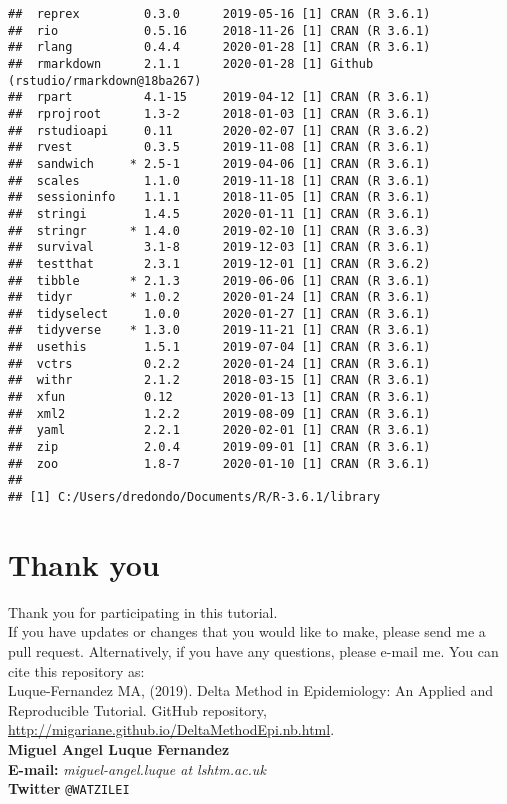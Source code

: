 \documentclass[
]{article}
\begin{document}
\begin{verbatim}
##  reprex         0.3.0      2019-05-16 [1] CRAN (R 3.6.1)                    
##  rio            0.5.16     2018-11-26 [1] CRAN (R 3.6.1)                    
##  rlang          0.4.4      2020-01-28 [1] CRAN (R 3.6.1)                    
##  rmarkdown      2.1.1      2020-01-28 [1] Github (rstudio/rmarkdown@18ba267)
##  rpart          4.1-15     2019-04-12 [1] CRAN (R 3.6.1)                    
##  rprojroot      1.3-2      2018-01-03 [1] CRAN (R 3.6.1)                    
##  rstudioapi     0.11       2020-02-07 [1] CRAN (R 3.6.2)                    
##  rvest          0.3.5      2019-11-08 [1] CRAN (R 3.6.1)                    
##  sandwich     * 2.5-1      2019-04-06 [1] CRAN (R 3.6.1)                    
##  scales         1.1.0      2019-11-18 [1] CRAN (R 3.6.1)                    
##  sessioninfo    1.1.1      2018-11-05 [1] CRAN (R 3.6.1)                    
##  stringi        1.4.5      2020-01-11 [1] CRAN (R 3.6.1)                    
##  stringr      * 1.4.0      2019-02-10 [1] CRAN (R 3.6.3)                    
##  survival       3.1-8      2019-12-03 [1] CRAN (R 3.6.1)                    
##  testthat       2.3.1      2019-12-01 [1] CRAN (R 3.6.2)                    
##  tibble       * 2.1.3      2019-06-06 [1] CRAN (R 3.6.1)                    
##  tidyr        * 1.0.2      2020-01-24 [1] CRAN (R 3.6.1)                    
##  tidyselect     1.0.0      2020-01-27 [1] CRAN (R 3.6.1)                    
##  tidyverse    * 1.3.0      2019-11-21 [1] CRAN (R 3.6.1)                    
##  usethis        1.5.1      2019-07-04 [1] CRAN (R 3.6.1)                    
##  vctrs          0.2.2      2020-01-24 [1] CRAN (R 3.6.1)                    
##  withr          2.1.2      2018-03-15 [1] CRAN (R 3.6.1)                    
##  xfun           0.12       2020-01-13 [1] CRAN (R 3.6.1)                    
##  xml2           1.2.2      2019-08-09 [1] CRAN (R 3.6.1)                    
##  yaml           2.2.1      2020-02-01 [1] CRAN (R 3.6.1)                    
##  zip            2.0.4      2019-09-01 [1] CRAN (R 3.6.1)                    
##  zoo            1.8-7      2020-01-10 [1] CRAN (R 3.6.1)                    
## 
## [1] C:/Users/dredondo/Documents/R/R-3.6.1/library
\end{verbatim}

\hypertarget{thank-you}{%
\section{Thank you}\label{thank-you}}

Thank you for participating in this tutorial.\\
If you have updates or changes that you would like to make, please send
me a pull request. Alternatively, if you have any questions, please
e-mail me. You can cite this repository as:\\
Luque-Fernandez MA, (2019). Delta Method in Epidemiology: An Applied and
Reproducible Tutorial. GitHub repository,
\url{http://migariane.github.io/DeltaMethodEpi.nb.html}.\\
\textbf{Miguel Angel Luque Fernandez}\\
\textbf{E-mail:} \emph{miguel-angel.luque at lshtm.ac.uk}\\
\textbf{Twitter} \texttt{@WATZILEI}
\end{document}
